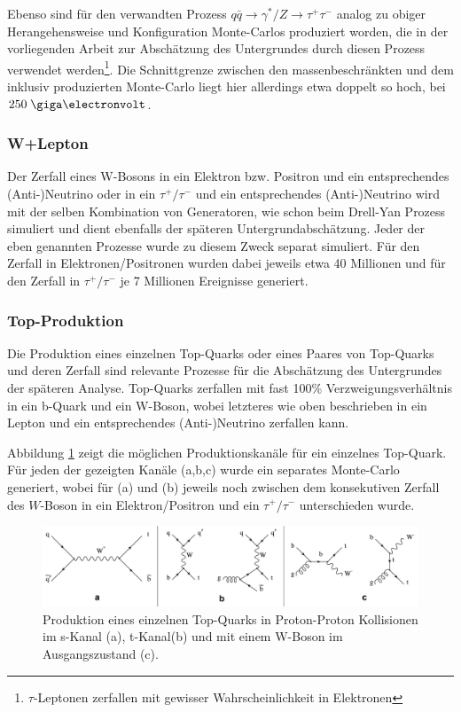 Ebenso sind für den verwandten Prozess
$q\bar q \rightarrow \gamma^*/Z \rightarrow \tau^+\tau^-$ analog zu obiger 
Herangehensweise und Konfiguration Monte-Carlos produziert worden, die in
der vorliegenden Arbeit zur Abschätzung des Untergrundes durch diesen Prozess
verwendet werden\footnote{$\tau$-Leptonen zerfallen mit gewisser
Wahrscheinlichkeit in Elektronen}. Die Schnittgrenze zwischen den
massenbeschränkten und dem inklusiv produzierten Monte-Carlo liegt hier
allerdings etwa doppelt so hoch, bei $250 \GeV$.

\subsubsection*{W+Lepton}
Der Zerfall eines W-Bosons in ein Elektron bzw. Positron und ein entsprechendes
(Anti-)Neutrino oder in ein $\tau^+/\tau^-$ und ein entsprechendes
(Anti-)Neutrino wird mit der selben Kombination von Generatoren, wie schon beim
Drell-Yan Prozess simuliert und dient ebenfalls der späteren
Untergrundabschätzung. Jeder der eben genannten Prozesse wurde zu diesem Zweck
separat simuliert. Für den Zerfall in Elektronen/Positronen wurden dabei
jeweils etwa 40 Millionen und für den Zerfall in $\tau^+/\tau^-$ je 7
Millionen Ereignisse generiert.

\subsubsection*{Top-Produktion}
Die Produktion eines einzelnen Top-Quarks oder eines Paares von Top-Quarks und
deren Zerfall sind relevante Prozesse für die Abschätzung des Untergrundes der
späteren Analyse. Top-Quarks zerfallen mit fast 100\% Verzweigungsverhältnis in
ein b-Quark und ein W-Boson, wobei letzteres wie oben beschrieben in ein Lepton
und ein entsprechendes (Anti-)Neutrino zerfallen kann.

Abbildung \ref{fig:singletop} zeigt die möglichen Produktionskanäle für ein
einzelnes Top-Quark. Für jeden der gezeigten Kanäle (a,b,c) wurde ein separates
Monte-Carlo generiert, wobei für (a) und (b) jeweils noch zwischen dem
konsekutiven Zerfall des $W$-Boson in ein Elektron/Positron und ein
$\tau^+/\tau^-$ unterschieden wurde.

\begin{figure}
    \centering
    \includegraphics[width=1.\textwidth]{img/singletop}
    \caption[Produktionskanäle für ein einzelnes Top-Quark in Proton-Proton
        Kollisionen]
        {Produktion eines einzelnen Top-Quarks in Proton-Proton Kollisionen im
        s-Kanal (a), t-Kanal(b) und mit einem W-Boson im Ausgangszustand (c).}
    \label{fig:singletop}
\end{figure}

